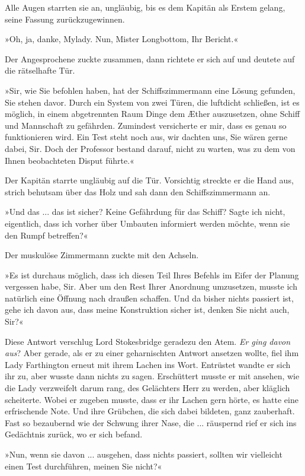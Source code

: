 Alle Augen starrten sie an, ungläubig, bis es dem Kapitän als
Erstem gelang, seine Fassung zurückzugewinnen.

»Oh, ja, danke, Mylady. Nun, Mister Longbottom, Ihr Bericht.«

Der Angesprochene zuckte zusammen, dann richtete er sich auf und
deutete auf die rätselhafte Tür.

»Sir, wie Sie befohlen haben, hat der Schiffszimmermann eine Lösung
gefunden, Sie stehen davor. Durch ein System von zwei Türen, die
luftdicht schließen, ist es möglich, in einem abgetrennten Raum
Dinge dem Æther auszusetzen, ohne Schiff und Mannschaft zu
gefährden. Zumindest versicherte er mir, dass es genau so
funktionieren wird. Ein Test steht noch aus, wir dachten uns, Sie
wären gerne dabei, Sir. Doch der Professor bestand darauf, nicht zu
warten, was zu dem von Ihnen beobachteten Disput führte.«

Der Kapitän starrte ungläubig auf die Tür. Vorsichtig streckte er
die Hand aus, strich behutsam über das Holz und sah dann den
Schiffszimmermann an.

»Und das ... das ist sicher? Keine Gefährdung für das Schiff? Sagte
ich nicht, eigentlich, dass ich vorher über Umbauten informiert
werden möchte, wenn sie den Rumpf betreffen?«

Der muskulöse Zimmermann zuckte mit den Achseln.

»Es ist durchaus möglich, dass ich diesen Teil Ihres Befehls im
Eifer der Planung vergessen habe, Sir. Aber um den Rest Ihrer
Anordnung umzusetzen, musste ich natürlich eine Öffnung nach
draußen schaffen. Und da bisher nichts passiert ist, gehe ich davon
aus, dass meine Konstruktion sicher ist, denken Sie nicht auch,
Sir?«

Diese Antwort verschlug Lord Stokesbridge geradezu den Atem.
\emph{Er ging davon aus}? Aber gerade, als er zu einer
geharnischten Antwort ansetzen wollte, fiel ihm Lady Farthington
erneut mit ihrem Lachen ins Wort. Entrüstet wandte er sich ihr zu,
aber wusste dann nichts zu sagen. Erschüttert musste er mit
ansehen, wie die Lady verzweifelt darum rang, des Gelächters Herr
zu werden, aber kläglich scheiterte. Wobei er zugeben musste, dass
er ihr Lachen gern hörte, es hatte eine erfrischende Note. Und ihre
Grübchen, die sich dabei bildeten, ganz zauberhaft. Fast so
bezaubernd wie der Schwung ihrer Nase, die ... räuspernd rief er
sich ins Gedächtnis zurück, wo er sich befand.

»Nun, wenn sie davon ... ausgehen, dass nichts passiert, sollten
wir vielleicht einen Test durchführen, meinen Sie nicht?«

